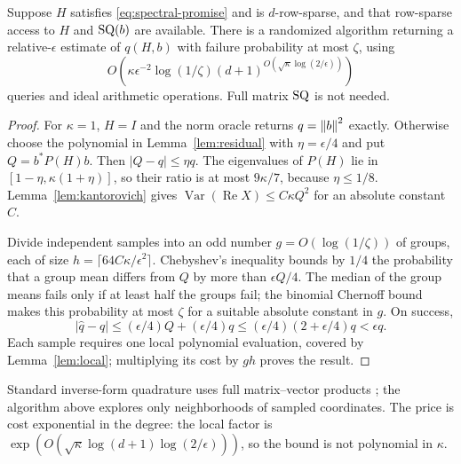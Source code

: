 \begin{theorem}\label{thm:classical-scalar}
Suppose $H$ satisfies \eqref{eq:spectral-promise} and is $d$-row-sparse,
and that row-sparse access to $H$ and $\mathrm{SQ}(b)$ are available. There is a randomized
algorithm returning a relative-$\epsilon$ estimate of $q(H,b)$ with failure
probability at most $\zeta$, using
\begin{equation}\label{eq:classical-bound}
 O\!\left(\kappa\epsilon^{-2}\log(1/\zeta)
       (d+1)^{O(\sqrt\kappa\log(2/\epsilon))}\right)
\end{equation}
queries and ideal arithmetic operations. Full matrix $\mathrm{SQ}$ is not needed.
\end{theorem}
\begin{proof}
For $\kappa=1$, $H=I$ and the norm oracle returns $q=\left\lVert b\right\rVert^2$ exactly.
Otherwise choose the polynomial in Lemma~\ref{lem:residual} with
$\eta=\epsilon/4$ and put $Q=b^*P(H)b$. Then
$|Q-q|\leq\eta q$. The eigenvalues of $P(H)$ lie in
$[1-\eta,\kappa(1+\eta)]$, so their ratio is at most
$9\kappa/7$, because $\eta\leq1/8$. Lemma~\ref{lem:kantorovich} gives
$\operatorname{Var}(\operatorname{Re}X)\leq C\kappa Q^2$ for an absolute
constant $C$.

Divide independent samples into an odd number
$g=O(\log(1/\zeta))$ of groups, each of size
$h=\lceil64C\kappa/\epsilon^2\rceil$. Chebyshev's inequality bounds by
$1/4$ the probability that a group mean differs from $Q$ by more than
$\epsilon Q/4$. The median of the group means fails only if at least half
the groups fail; the binomial Chernoff bound makes this probability at most
$\zeta$ for a suitable absolute constant in $g$. On success,
\[
 |\widehat q-q|
 \leq(\epsilon/4)Q+(\epsilon/4)q
 \leq(\epsilon/4)(2+\epsilon/4)q<\epsilon q.
\]
Each sample requires one local polynomial evaluation, covered by
Lemma~\ref{lem:local}; multiplying its cost by $gh$ proves the result.
\end{proof}

Standard inverse-form quadrature uses full matrix--vector products
\citep{LiSraJegelka2016}; the algorithm above explores only neighborhoods
of sampled coordinates. The price is cost exponential in the degree: the
local factor is $\exp(O(\sqrt\kappa\log(d+1)\log(2/\epsilon)))$, so the
bound is not polynomial in $\kappa$.

